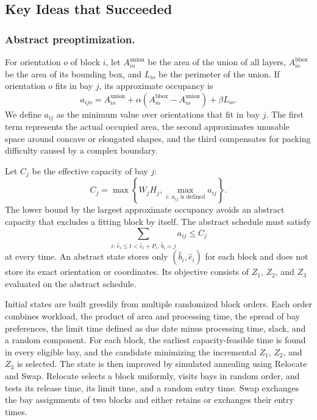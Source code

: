 \documentclass[runningheads]{llncs}
\begin{document}
\subsection{Key Ideas that Succeeded}

\subsubsection{Abstract preoptimization.}
For orientation $o$ of block $i$, let $A^{\mathrm{union}}_{io}$ be the area of the union of all layers, $A^{\mathrm{bbox}}_{io}$ be the area of its bounding box, and $L_{io}$ be the perimeter of the union. If orientation $o$ fits in bay $j$, its approximate occupancy is
\begin{equation}
a_{ijo}=A^{\mathrm{union}}_{io}
+\alpha\left(A^{\mathrm{bbox}}_{io}-A^{\mathrm{union}}_{io}\right)
+\beta L_{io}.
\end{equation}
We define $a_{ij}$ as the minimum value over orientations that fit in bay $j$. The first term represents the actual occupied area, the second approximates unusable space around concave or elongated shapes, and the third compensates for packing difficulty caused by a complex boundary.

Let $C_j$ be the effective capacity of bay $j$:
\begin{equation}
C_j=\max\left\{W_jH_j,\max_{i:\,a_{ij}\text{ is defined}}a_{ij}\right\}.
\end{equation}
The lower bound by the largest approximate occupancy avoids an abstract capacity that excludes a fitting block by itself. The abstract schedule must satisfy
\begin{equation}
\sum_{i:\,\hat e_i\le t<\hat e_i+P_i,\,\hat b_i=j}a_{ij}\le C_j
\end{equation}
at every time. An abstract state stores only $(\hat b_i,\hat e_i)$ for each block and does not store its exact orientation or coordinates. Its objective consists of $Z_1$, $Z_2$, and $Z_3$ evaluated on the abstract schedule.

Initial states are built greedily from multiple randomized block orders. Each order combines workload, the product of area and processing time, the spread of bay preferences, the limit time defined as due date minus processing time, slack, and a random component. For each block, the earliest capacity-feasible time is found in every eligible bay, and the candidate minimizing the incremental $Z_1$, $Z_2$, and $Z_3$ is selected. The state is then improved by simulated annealing using Relocate and Swap. Relocate selects a block uniformly, visits bays in random order, and tests its release time, its limit time, and a random entry time. Swap exchanges the bay assignments of two blocks and either retains or exchanges their entry times.
\end{document}
